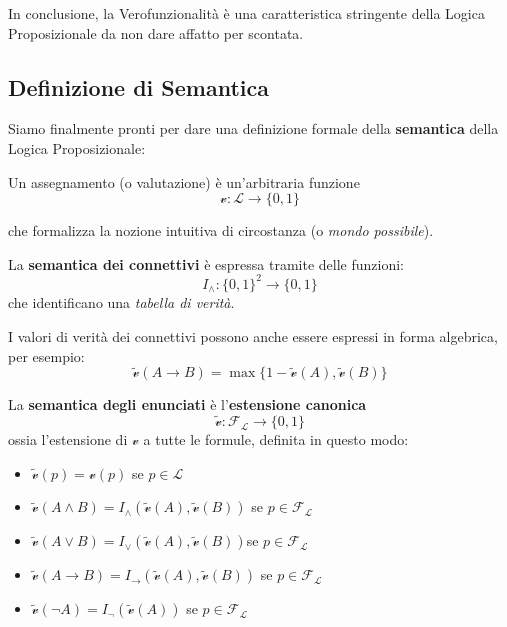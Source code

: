 In conclusione, la Verofunzionalità è una caratteristica stringente della Logica Proposizionale da non dare affatto per scontata.

\subsection{Definizione di Semantica}
Siamo finalmente pronti per dare una definizione formale della 
\textbf{semantica} della Logica Proposizionale: 
\begin{defi}
Un assegnamento (o valutazione) è un'arbitraria funzione 
$$
\mathcal{v} : \mathscr{L} \rightarrow \{0,1\}
$$ 
\end{defi}
che formalizza la nozione intuitiva di circostanza (o \textit{mondo possibile}). 

\begin{defi}
        La \textbf{semantica dei connettivi} è espressa tramite delle funzioni:
$$
I_{\land} : \{0,1\}^2 \rightarrow \{0,1\}
$$
che identificano una \textit{tabella di verità}.
\end{defi}
I valori di verità dei connettivi possono anche essere espressi in forma algebrica, per esempio:
$$
\widetilde{\mathcal{v}}(A \rightarrow B) = \max\{1-\widetilde{\mathcal{v}}(A), \widetilde{\mathcal{v}}(B)\}
$$

\begin{defi}
        La \textbf{semantica degli enunciati} è l'\textbf{estensione canonica}
$$
\widetilde{\mathcal{v}}: \mathscr{F_L} \rightarrow \{0,1\}
$$
ossia l'estensione di $\mathcal{v}$ a tutte le formule, definita in questo modo: 
\begin{itemize}
  \item $\widetilde{\mathcal{v}}(p) = \mathcal{v}(p)$ se $p \in \mathscr{L}$
  \item $\widetilde{\mathcal{v}}(A \land B) = I_{\land}(\widetilde{\mathcal{v}}(A), \widetilde{\mathcal{v}}(B))$ se $p \in \mathscr{F_L}$
  \item $\widetilde{\mathcal{v}}(A \lor B) = I_{\lor}(\widetilde{\mathcal{v}}(A), \widetilde{\mathcal{v}}(B))$se $p \in \mathscr{F_L}$
  \item $\widetilde{\mathcal{v}}(A \rightarrow B) = I_{\rightarrow}(\widetilde{\mathcal{v}}(A), \widetilde{\mathcal{v}}(B))$ se $p \in \mathscr{F_L}$
  \item $\widetilde{\mathcal{v}}(\neg A) = I_{\neg}(\widetilde{\mathcal{v}}(A))$ se $p \in \mathscr{F_L}$
\end{itemize}
\end{defi}

